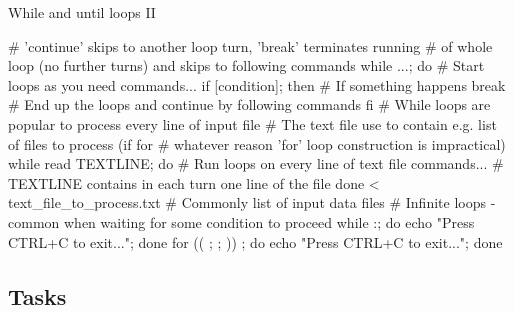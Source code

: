 \documentclass[compress, xelatex, 11pt, xcolor=svgnames, aspectratio=169, url={hyphens, lowtilde}]{beamer}
\begin{document}
\begin{frame}[fragile]{While and until loops II}
	\begin{bashcode}
    # 'continue' skips to another loop turn, 'break' terminates running
    # of whole loop (no further turns) and skips to following commands
    while ...; do # Start loops as you need
      commands...
      if [condition]; then # If something happens
        break # End up the loops and continue by following commands
        fi
    # While loops are popular to process every line of input file
    # The text file use to contain e.g. list of files to process (if for
    # whatever reason 'for' loop construction is impractical)
    while read TEXTLINE; do # Run loops on every line of text file
      commands... # TEXTLINE contains in each turn one line of the file
      done < text_file_to_process.txt # Commonly list of input data files
    # Infinite loops - common when waiting for some condition to proceed
    while :; do echo "Press CTRL+C to exit..."; done
    for (( ; ; )) ; do echo "Press CTRL+C to exit..."; done
	\end{bashcode}
\end{frame}

\subsection{Tasks}
\end{document}
